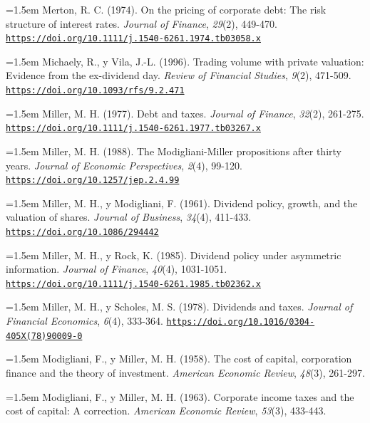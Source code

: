 \documentclass[10pt,a4paper]{article}
\begin{document}
\noindent\hangindent=1.5em Merton, R. C. (1974). On the pricing of corporate debt: The risk structure of interest rates. \textit{Journal of Finance}, \textit{29}(2), 449-470. \href{https://doi.org/10.1111/j.1540-6261.1974.tb03058.x}{\nolinkurl{https://doi.org/10.1111/j.1540-6261.1974.tb03058.x}}

\noindent\hangindent=1.5em Michaely, R., y Vila, J.-L. (1996). Trading volume with private valuation: Evidence from the ex-dividend day. \textit{Review of Financial Studies}, \textit{9}(2), 471-509. \href{https://doi.org/10.1093/rfs/9.2.471}{\nolinkurl{https://doi.org/10.1093/rfs/9.2.471}}

\noindent\hangindent=1.5em Miller, M. H. (1977). Debt and taxes. \textit{Journal of Finance}, \textit{32}(2), 261-275. \href{https://doi.org/10.1111/j.1540-6261.1977.tb03267.x}{\nolinkurl{https://doi.org/10.1111/j.1540-6261.1977.tb03267.x}}

\noindent\hangindent=1.5em Miller, M. H. (1988). The Modigliani-Miller propositions after thirty years. \textit{Journal of Economic Perspectives}, \textit{2}(4), 99-120. \href{https://doi.org/10.1257/jep.2.4.99}{\nolinkurl{https://doi.org/10.1257/jep.2.4.99}}

\noindent\hangindent=1.5em Miller, M. H., y Modigliani, F. (1961). Dividend policy, growth, and the valuation of shares. \textit{Journal of Business}, \textit{34}(4), 411-433. \href{https://doi.org/10.1086/294442}{\nolinkurl{https://doi.org/10.1086/294442}}

\noindent\hangindent=1.5em Miller, M. H., y Rock, K. (1985). Dividend policy under asymmetric information. \textit{Journal of Finance}, \textit{40}(4), 1031-1051. \href{https://doi.org/10.1111/j.1540-6261.1985.tb02362.x}{\nolinkurl{https://doi.org/10.1111/j.1540-6261.1985.tb02362.x}}

\noindent\hangindent=1.5em Miller, M. H., y Scholes, M. S. (1978). Dividends and taxes. \textit{Journal of Financial Economics}, \textit{6}(4), 333-364. \href{https://doi.org/10.1016/0304-405X(78)90009-0}{\nolinkurl{https://doi.org/10.1016/0304-405X(78)90009-0}}

\noindent\hangindent=1.5em Modigliani, F., y Miller, M. H. (1958). The cost of capital, corporation finance and the theory of investment. \textit{American Economic Review}, \textit{48}(3), 261-297.

\noindent\hangindent=1.5em Modigliani, F., y Miller, M. H. (1963). Corporate income taxes and the cost of capital: A correction. \textit{American Economic Review}, \textit{53}(3), 433-443.
\end{document}
